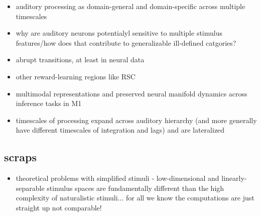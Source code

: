 \begin{multicols}{2}
\begin{itemize}
\item auditory processing as domain-general and domain-specific across multiple timescales \cite{norman-haignereHierarchicalIntegrationMultiple2020}
\item why are auditory neurons potentialyl sensitive to multiple stimulus features/how does that contribute to generalizable ill-defined catgories? \cite{macellaioWhySensoryNeurons2020}
\item abrupt transitions, at least in neural data \cite{durstewitzAbruptTransitionsPrefrontal2010}
\item other reward-learning regions like RSC \cite{millerRetrosplenialCorticalRepresentations2019}
\item multimodal representations and preserved neural manifold dynamics across inference tasks in M1 \cite{gallegoCorticalPopulationActivity2018}
\item timescales of processing expand across auditory hierarchy (and more generally have different timescales of integration and lags) \cite{norman-haignereHierarchicalIntegrationMultiple2020} and are lateralized \cite{levyCircuitAsymmetriesUnderlie2019a}
\end{itemize}

\subsection{scraps}

\begin{itemize}
\item theoretical problems with simplified stimuli - low-dimensional and linearly-separable stimulus spaces are fundamentally different than the high complexity of naturalistic stimuli... for all we know the computations are just straight up not comparable! \cite{schuesslerInterplayRandomnessStructure2020}

\end{itemize}

\end{multicols}

% 